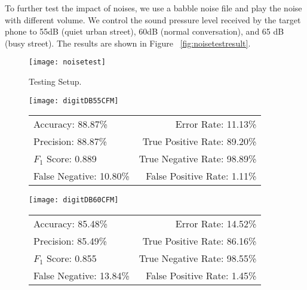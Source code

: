 To further test the impact of noises, we use a babble noise file and play the noise with different volume. We control the sound pressure level received by the target phone to 55dB (quiet urban street), 60dB (normal conversation), and 65 dB (busy street). The results are shown in Figure ~\ref{fig:noisetestresult}.
\begin{figure}[!h]
	\centering
	\texttt{[image: noisetest]}
	\caption{Testing Setup.}
	\label{fig:noisetest}
\end{figure}
\begin{landscape}
	\begin{figure}[!h]
		
		\begin{minipage}[c]{.33\linewidth}
			\centering
			\texttt{[image: digitDB55CFM]}
			\tiny
			\begin{tabular}{lr}
				\toprule
				Accuracy: 88.87\% & \hspace{-.00in} Error Rate: 11.13\% \\
				Precision: 88.87\% & \hspace{-.00in} True Positive Rate: 89.20\% \\
				$F_1$ Score: 0.889 & \hspace{-.00in} True Negative Rate: 98.89\% \\
				False Negative: 10.80\%  & \hspace{-.00in} False Positive Rate: 1.11\% \\
				\bottomrule
			\end{tabular}
		\end{minipage}
		\begin{minipage}[c]{.33\linewidth}
			\centering
			\texttt{[image: digitDB60CFM]}
			\tiny
			\begin{tabular}{lr}
				\toprule
				Accuracy: 85.48\% & \hspace{-.00in} Error Rate: 14.52\% \\
				Precision: 85.49\% & \hspace{-.00in} True Positive Rate: 86.16\% \\
				$F_1$ Score: 0.855 & \hspace{-.00in} True Negative Rate: 98.55\% \\
				False Negative: 13.84\%  & \hspace{-.00in} False Positive Rate: 1.45\% \\
				\bottomrule
			\end{tabular}

\end{minipage}
\end{figure}
\end{landscape}
